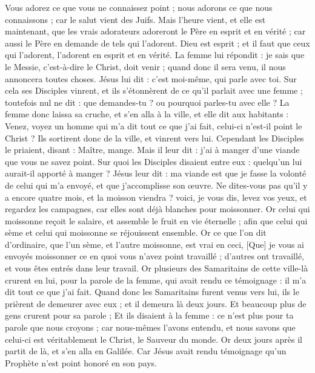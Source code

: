 \begin{multicols}{2}
Vous adorez ce que vous ne connaissez point ; nous adorons ce que nous connaissons ; car le salut vient des Juifs.
Mais l'heure vient, et elle est maintenant, que les vrais adorateurs adoreront le Père en esprit et en vérité ; car aussi le Père en demande de tels qui l'adorent.
Dieu est esprit ; et il faut que ceux qui l'adorent, l'adorent en esprit et en vérité.
La femme lui répondit : je sais que le Messie, c'est-à-dire le Christ, doit venir ; quand donc il sera venu, il nous annoncera toutes choses.
Jésus lui dit : c'est moi-même, qui parle avec toi.
Sur cela ses Disciples vinrent, et ils s'étonnèrent de ce qu'il parlait avec une femme ; toutefois nul ne dit : que demandes-tu ? ou pourquoi parles-tu avec elle ?
La femme donc laissa sa cruche, et s'en alla à la ville, et elle dit aux habitants :
Venez, voyez un homme qui m'a dit tout ce que j'ai fait, celui-ci n'est-il point le Christ ?
Ils sortirent donc de la ville, et vinrent vers lui.
Cependant les Disciples le priaient, disant : Maître, mange.
Mais il leur dit : j'ai à manger d'une viande que vous ne savez point.
Sur quoi les Disciples disaient entre eux : quelqu'un lui aurait-il apporté à manger ?
Jésus leur dit : ma viande est que je fasse la volonté de celui qui m'a envoyé, et que j'accomplisse son œuvre.
Ne dites-vous pas qu'il y a encore quatre mois, et la moisson viendra ? voici, je vous dis, levez vos yeux, et regardez les campagnes, car elles sont déjà blanches pour moissonner.
Or celui qui moissonne reçoit le salaire, et assemble le fruit en vie éternelle ; afin que celui qui sème et celui qui moissonne se réjouissent ensemble.
Or ce que l'on dit d'ordinaire, que l'un sème, et l'autre moissonne, est vrai en ceci,
[Que] je vous ai envoyés moissonner ce en quoi vous n'avez point travaillé ; d'autres ont travaillé, et vous êtes entrés dans leur travail.
Or plusieurs des Samaritains de cette ville-là crurent en lui, pour la parole de la femme, qui avait rendu ce témoignage : il m'a dit tout ce que j'ai fait.
Quand donc les Samaritains furent venus vers lui, ils le prièrent de demeurer avec eux ; et il demeura là deux jours.
Et beaucoup plus de gens crurent pour sa parole ;
Et ils disaient à la femme : ce n'est plus pour ta parole que nous croyons ; car nous-mêmes l'avons entendu, et nous savons que celui-ci est véritablement le Christ, le Sauveur du monde.
Or deux jours après il partit de là, et s'en alla en Galilée.
Car Jésus avait rendu témoignage qu'un Prophète n'est point honoré en son pays.

\end{multicols}

